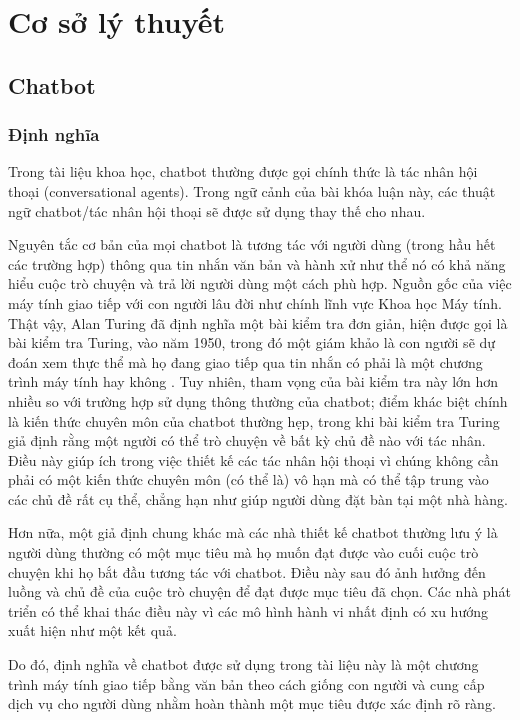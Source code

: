 \chapter{Cơ sở lý thuyết}
\label{chapter:related_work}
\section{Chatbot}
\label{section:chatbot}
\subsection{Định nghĩa}
\label{subsection:definition}

Trong tài liệu khoa học, chatbot thường được gọi chính thức là tác nhân hội thoại (conversational agents). Trong ngữ cảnh của bài khóa luận này, các thuật ngữ chatbot/tác nhân hội thoại sẽ được sử dụng thay thế cho nhau.

Nguyên tắc cơ bản của mọi chatbot là tương tác với người dùng (trong hầu hết các trường hợp) thông qua tin nhắn văn bản và hành xử như thể nó có khả năng hiểu cuộc trò chuyện và trả lời người dùng một cách phù hợp. Nguồn gốc của việc máy tính giao tiếp với con người lâu đời như chính lĩnh vực Khoa học Máy tính. Thật vậy, Alan Turing đã định nghĩa một bài kiểm tra đơn giản, hiện được gọi là bài kiểm tra Turing, vào năm 1950, trong đó một giám khảo là con người sẽ dự đoán xem thực thể mà họ đang giao tiếp qua tin nhắn có phải là một chương trình máy tính hay không \cite{radford2018improving}. Tuy nhiên, tham vọng của bài kiểm tra này lớn hơn nhiều so với trường hợp sử dụng thông thường của chatbot; điểm khác biệt chính là kiến thức chuyên môn của chatbot thường hẹp, trong khi bài kiểm tra Turing giả định rằng một người có thể trò chuyện về bất kỳ chủ đề nào với tác nhân. Điều này giúp ích trong việc thiết kế các tác nhân hội thoại vì chúng không cần phải có một kiến thức chuyên môn (có thể là) vô hạn mà có thể tập trung vào các chủ đề rất cụ thể, chẳng hạn như giúp người dùng đặt bàn tại một nhà hàng.

Hơn nữa, một giả định chung khác mà các nhà thiết kế chatbot thường lưu ý là người dùng thường có một mục tiêu mà họ muốn đạt được vào cuối cuộc trò chuyện khi họ bắt đầu tương tác với chatbot. Điều này sau đó ảnh hưởng đến luồng và chủ đề của cuộc trò chuyện để đạt được mục tiêu đã chọn. Các nhà phát triển có thể khai thác điều này vì các mô hình hành vi nhất định có xu hướng xuất hiện như một kết quả.

Do đó, định nghĩa về chatbot được sử dụng trong tài liệu này là một chương trình máy tính giao tiếp bằng văn bản theo cách giống con người và cung cấp dịch vụ cho người dùng nhằm hoàn thành một mục tiêu được xác định rõ ràng.

